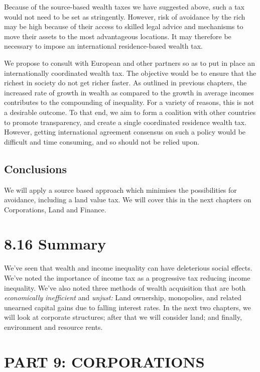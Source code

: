 \documentclass[]{tufte-handout}
\begin{document}
Because of the source-based wealth taxes we have suggested above, such a
tax would not need to be set as stringently. However, risk of avoidance
by the rich may be high because of their access to skilled legal advice
and mechanisms to move their assets to the most advantageous locations.
It may therefore be necessary to impose an international residence-based
wealth tax.

We propose to consult with European and other partners so as to put in
place an internationally coordinated wealth tax. The objective would be
to ensure that the richest in society do not get richer faster. As
outlined in previous chapters, the increased rate of growth in wealth as
compared to the growth in average incomes contributes to the compounding
of inequality. For a variety of reasons, this is not a desirable
outcome. To that end, we aim to form a coalition with other countries to
promote transparency, and create a single coordinated residence wealth
tax. However, getting international agreement consensus on such a policy
would be difficult and time consuming, and so should not be relied upon.

\hypertarget{conclusions-3}{%
\subsection{Conclusions}\label{conclusions-3}}

We will apply a source based approach which minimises the possibilities
for avoidance, including a land value tax. We will cover this in the
next chapters on Corporations, Land and Finance.

\hypertarget{summary-3}{%
\section{8.16 Summary}\label{summary-3}}

We've seen that wealth and income inequality can have deleterious social
effects. We've noted the importance of income tax as a progressive tax
reducing income inequality. We've also noted three methods of wealth
acquisition that are both \emph{economically inefficient} and
\emph{unjust:} Land ownership, monopolies, and related unearned capital
gains due to falling interest rates. In the next two chapters, we will
look at corporate structures; after that we will consider land; and
finally, environment and resource rents.

\newpage

\hypertarget{part-9-corporations}{%
\section{PART 9: CORPORATIONS}\label{part-9-corporations}}
\end{document}
